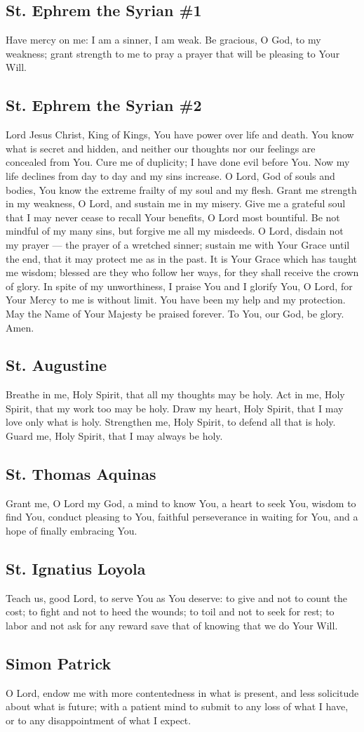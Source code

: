 \documentclass[12pt]{article}
\newcommand{\prayertitle}[1]{\subsection{#1}}
\begin{document}
\prayertitle{St. Ephrem the Syrian \#1}
Have mercy on me:
I am a sinner, I am weak.
Be gracious, O God, to my weakness;
grant strength to me to pray a prayer that will be pleasing to Your Will.

\prayertitle{St. Ephrem the Syrian \#2}
\label{prayer:StEphrem2}
Lord Jesus Christ, King of Kings, You have power over life and death.
You know what is secret and hidden, and neither our thoughts nor our feelings are concealed from You.
Cure me of duplicity;
I have done evil before You.
Now my life declines from day to day and my sins increase.
O Lord, God of souls and bodies, You know the extreme frailty of
my soul and my flesh.
Grant me strength in my weakness, O Lord, and sustain me in my misery.
Give me a grateful soul that I may never cease to recall Your benefits, O Lord most bountiful.
Be not mindful of my many sins, but forgive me all my misdeeds.
O Lord, disdain not my prayer --- the prayer of a wretched sinner;
sustain me with Your Grace until the end, that it may protect me as in the past.
It is Your Grace which has taught me wisdom;
blessed are they who follow her ways, for they shall receive the crown of glory.
In spite of my unworthiness, I praise You and I glorify You, O Lord, for Your Mercy to me is without limit.
You have been my help and my protection.
May the Name of Your Majesty be praised forever. 
To You, our God, be glory.
Amen.

\prayertitle{St. Augustine}
Breathe in me, Holy Spirit, that all my thoughts may be holy.
Act in me, Holy Spirit, that my work too may be holy.
Draw my heart, Holy Spirit, that I may love only what is holy.
Strengthen me, Holy Spirit, to defend all that is holy.
Guard me, Holy Spirit, that I may always be holy.

\prayertitle{St. Thomas Aquinas}
Grant me, O Lord my God,
a mind to know You,
a heart to seek You,
wisdom to find You,
conduct pleasing to You,
faithful perseverance in waiting for You,
and a hope of finally embracing You.

\prayertitle{St. Ignatius Loyola}
Teach us, good Lord, to serve You as You deserve:
to give and not to count the cost;
to fight and not to heed the wounds;
to toil and not to seek for rest;
to labor and not ask for any reward save that of knowing that we do Your Will.

\prayertitle{Simon Patrick}
O Lord, endow me with more contentedness in what is present, and less solicitude about what is future;
with a patient mind to submit to any loss of what I have, or to  any disappointment of what I expect.
\end{document}
